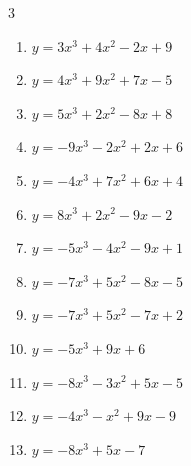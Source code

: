 \begin{multicols}{3}
\begin{enumerate}
  \item $y=3x^{3}+4x^{2}-2x+9$


  \item $y=4x^{3}+9x^{2}+7x-5$


  \item $y=5x^{3}+2x^{2}-8x+8$


  \item $y=-9x^{3}-2x^{2}+2x+6$


  \item $y=-4x^{3}+7x^{2}+6x+4$


  \item $y=8x^{3}+2x^{2}-9x-2$


  \item $y=-5x^{3}-4x^{2}-9x+1$


  \item $y=-7x^{3}+5x^{2}-8x-5$


  \item $y=-7x^{3}+5x^{2}-7x+2$


  \item $y=-5x^{3}+9x+6$


  \item $y=-8x^{3}-3x^{2}+5x-5$


  \item $y=-4x^{3}-x^{2}+9x-9$


\columnbreak %

  \item $y=-8x^{3}+5x-7$


\end{enumerate}
\end{multicols}
